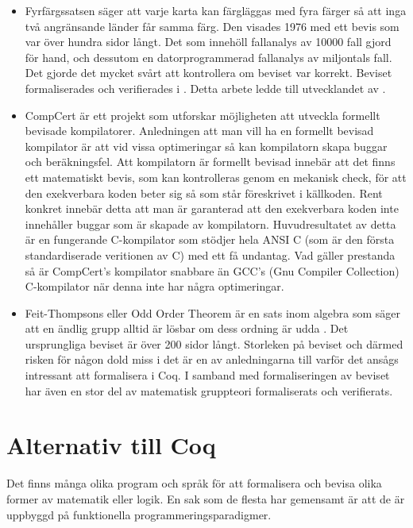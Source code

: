 \begin{itemize}
\item Fyrfärgssatsen \autocite{gonthier2008formal}\cite{gonthier2005computer}
säger att varje karta kan färgläggas med fyra färger så att inga två
angränsande länder får samma färg. Den visades 1976 med ett bevis som var över
hundra sidor långt. Det som innehöll fallanalys av 10000 fall gjord för hand,
och dessutom en datorprogrammerad fallanalys av miljontals fall. Det gjorde det
mycket svårt att kontrollera om beviset var korrekt. Beviset formaliserades och
verifierades i . Detta arbete ledde till utvecklandet av \ssr.

\item CompCert\autocite{compcert} är ett projekt som utforskar möjligheten att
utveckla formellt bevisade kompilatorer. Anledningen att man vill ha en
formellt bevisad kompilator är att vid vissa optimeringar så kan kompilatorn
skapa buggar och beräkningsfel. Att kompilatorn är formellt bevisad innebär att
det finns ett matematiskt bevis, som kan kontrolleras genom en mekanisk check,
för att den exekverbara koden beter sig så som står föreskrivet i källkoden.
Rent konkret innebär detta att man är garanterad att den exekverbara koden inte
innehåller buggar som är skapade av kompilatorn. Huvudresultatet av detta är en
fungerande C-kompilator som stödjer hela ANSI C (som är den första
standardiserade veritionen av C) med ett få undantag. Vad gäller prestanda så
är CompCert's kompilator snabbare än GCC's (Gnu Compiler Collection)
C-kompilator när denna inte har några optimeringar.

\item Feit-Thompsons eller Odd Order Theorem är en sats inom algebra som säger
att en ändlig grupp alltid är lösbar om dess ordning är udda
\cite{Gonthier:2013:EMO:2480359.2429071}. Det ursprungliga beviset är över 200
sidor långt\cite{feit1963}. Storleken på beviset och därmed risken för någon
dold miss i det är en av anledningarna till varför det ansågs intressant att
formalisera i Coq. I samband med formaliseringen av beviset har även en stor
del av matematisk gruppteori formaliserats och verifierats.
\end{itemize}

\section{Alternativ till Coq}
Det finns många olika program och språk för att formalisera och bevisa olika
former av matematik eller logik. En sak som de flesta har gemensamt är att de
är uppbyggd på funktionella programmeringsparadigmer.

